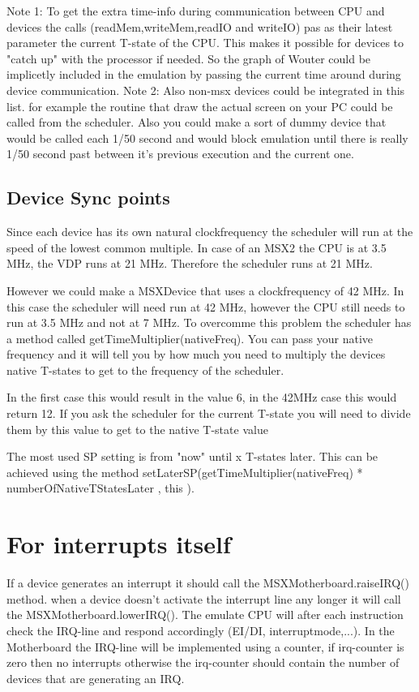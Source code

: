 \documentclass[11pt, a4paper]{report}
\begin{document}
Note 1: To get the extra time-info during communication between CPU and
devices the calls (readMem,writeMem,readIO and writeIO) pas as their
latest parameter the current T-state of the CPU. This makes it possible
for devices to "catch up" with the processor if needed. So the graph of
Wouter could be implicetly included in the emulation by passing
the current time around during device communication.
Note 2: Also non-msx devices could be integrated in this list. for example
the routine that draw the actual screen on your PC could be called from
the scheduler. Also you could make a sort of dummy device that would be
called each 1/50 second and would block emulation until there is really
1/50 second past between it's previous execution and the current one.

\subsection{Device Sync points}

Since each device has its own natural clockfrequency the scheduler will
run at the speed of the lowest common multiple. In case of an MSX2 the CPU
is at 3.5 MHz, the VDP runs at 21 MHz. Therefore the scheduler runs at 21
MHz.

However we could make a MSXDevice that uses a clockfrequency of 42 MHz. In
this case the scheduler will need run at 42 MHz, however the CPU still
needs to run at 3.5 MHz and not at 7 MHz. To overcomme this problem the
scheduler has a method called getTimeMultiplier(nativeFreq). You can pass
your native frequency and it will tell you by how much you need to
multiply the devices native T-states to get to the frequency of the
scheduler.

In the first case this would result in the value 6, in the 42MHz case this
would return 12. If you ask the scheduler for the current T-state you will
need to divide them by this value to get to the native T-state value

The most used SP setting is from "now" until x T-states later. This can be
achieved using the method setLaterSP(getTimeMultiplier(nativeFreq) *
numberOfNativeTStatesLater , this ).


\section{For interrupts itself}

If a device generates an interrupt it should call the
MSXMotherboard.raiseIRQ() method. when a device doesn't activate
the interrupt line any longer it will call the
MSXMotherboard.lowerIRQ(). The emulate CPU will after each
instruction check the IRQ-line and respond accordingly (EI/DI,
interruptmode,...).  In the Motherboard the IRQ-line will be
implemented using a counter, if irq-counter is zero then no
interrupts otherwise the irq-counter should contain the number of
devices that are generating an IRQ.
\end{document}
